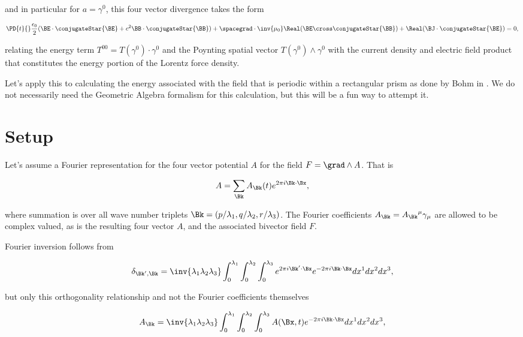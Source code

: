 and in particular for $a = \gamma^0$, this four vector divergence takes the form

\begin{align}\label{eqn:fourierMaxVac:4}
\PD{t}{}\frac{\epsilon_0}{2}(\BE \cdot \conjugateStar{\BE} + c^2 \BB \cdot \conjugateStar{\BB})
+ \spacegrad \cdot \inv{\mu_0} \Real (\BE \cross \conjugateStar{\BB} )
+ \Real( \BJ \cdot \conjugateStar{\BE} ) 
= 0,
\end{align}

relating the energy term $T^{00} = T(\gamma^0) \cdot \gamma^0$ and the Poynting spatial vector $T(\gamma^0) \wedge \gamma^0$ with the current density and electric field product that constitutes the energy portion of the Lorentz force density.

Let's apply this to calculating the energy associated with the field that is periodic within a rectangular prism as done by Bohm in \cite{bohm1989qt}.  We do not necessarily need the Geometric Algebra formalism for this calculation, but this will be a fun way to attempt it.

\section{Setup}

Let's assume a Fourier representation for the four vector potential $A$ for the field $F = \grad \wedge A$.  That is

\begin{align}
\label{eqn:fourierMaxVac:5}
A = \sum_{\Bk} A_\Bk(t) e^{2 \pi i \Bk \cdot \Bx},
\end{align}

where summation is over all wave number triplets $\Bk = (p/\lambda_1,q/\lambda_2,r/\lambda_3)$.  The Fourier coefficients $A_\Bk = {A_\Bk}^\mu \gamma_\mu$ are allowed to be complex valued, as is the resulting four vector $A$, and the associated bivector field $F$.

Fourier inversion follows from

\begin{align}\label{eqn:fourierMaxVac:6}
\delta_{\Bk', \Bk} =
\inv{ \lambda_1 \lambda_2 \lambda_3 }
\int_0^{\lambda_1}
\int_0^{\lambda_2}
\int_0^{\lambda_3} 
e^{2 \pi i \Bk' \cdot \Bx} 
e^{-2 \pi i \Bk \cdot \Bx} dx^1 dx^2 dx^3,
\end{align}

but only this orthogonality relationship and not the Fourier coefficients themselves

\begin{align}
\label{eqn:fourierMaxVac:7}
A_\Bk = 
\inv{ \lambda_1 \lambda_2 \lambda_3 }
\int_0^{\lambda_1}
\int_0^{\lambda_2}
\int_0^{\lambda_3} A(\Bx, t) e^{-2 \pi i \Bk \cdot \Bx} dx^1 dx^2 dx^3,
\end{align}

